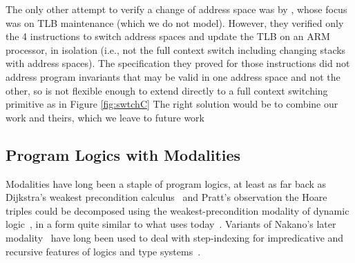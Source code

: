 The only other attempt to verify a change of address space was by \citet{syeda2018program,syeda2020formal}, whose focus was on TLB maintenance (which we
do not model). However, they verified only the 4 instructions to switch address spaces and update the TLB on an ARM processor, in isolation
(i.e., not the full context switch including changing stacks with address spaces).
The specification they proved for those instructions did not address program invariants that may be valid in one address space and not the other,
so is not flexible enough to extend directly to a full context switching primitive as in Figure \ref{fig:swtchC}
The right  solution would be to combine our work
and  theirs,  which we leave to future work

\subsection{Program Logics with Modalities}
Modalities have long been a staple of program logics, at least as far back as Dijkstra's weakest precondition calculus~\cite{dijkstra1975guarded}
and Pratt's observation the Hoare triples
could be decomposed using the weakest-precondition modality of dynamic logic~\cite{pratt1976semantical},
in a form quite similar to what \iris uses today~\cite{jung2018iris}.
Variants of Nakano's later modality~\cite{nakano2000modality} have long been used to deal with step-indexing 
for impredicative and recursive features of logics and type systems~\cite{Appel2007,hobor2010theory,birkedal2011step,birkedal2013intensional,jung2018iris}.

